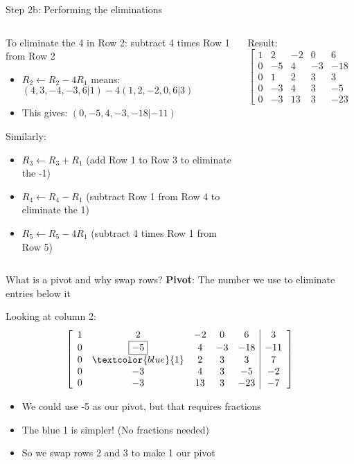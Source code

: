 \documentclass[aspectratio=169, lualatex, handout]{beamer}
\begin{document}
\begin{frame}{Step 2b: Performing the eliminations}
	\begin{columns}[c]
		\begin{column}{0.6\textwidth}
			To eliminate the 4 in Row 2: subtract 4 times Row 1 from Row 2
			\begin{itemize}
				\item $R_2 \leftarrow R_2 - 4R_1$ means: $(4, 3, -4, -3, 6 | 1) - 4(1, 2, -2, 0, 6 | 3)$
				\item This gives: $(0, -5, 4, -3, -18 | -11)$
			\end{itemize}

			Similarly:
			\begin{itemize}
				\item $R_3 \leftarrow R_3 + R_1$ (add Row 1 to Row 3 to eliminate the -1)
				\item $R_4 \leftarrow R_4 - R_1$ (subtract Row 1 from Row 4 to eliminate the 1)
				\item $R_5 \leftarrow R_5 - 4R_1$ (subtract 4 times Row 1 from Row 5)
			\end{itemize}
		\end{column}
		\begin{column}{0.4\textwidth}
			Result:
			\[
				\left[\begin{array}{ccccc|c}
						1 & 2  & -2 & 0  & 6   & 3   \\
						0 & -5 & 4  & -3 & -18 & -11 \\
						0 & 1  & 2  & 3  & 3   & 7   \\
						0 & -3 & 4  & 3  & -5  & -2  \\
						0 & -3 & 13 & 3  & -23 & -7
					\end{array}\right]
			\]
		\end{column}
	\end{columns}
\end{frame}

\begin{frame}{What is a pivot and why swap rows?}
	\textbf{Pivot}: The number we use to eliminate entries below it

	Looking at column 2:
	\[
		\left[\begin{array}{ccccc|c}
				1 & 2                   & -2 & 0  & 6   & 3   \\
				0 & \boxed{-5}          & 4  & -3 & -18 & -11 \\
				0 & \textcolor{blue}{1} & 2  & 3  & 3   & 7   \\
				0 & -3                  & 4  & 3  & -5  & -2  \\
				0 & -3                  & 13 & 3  & -23 & -7
			\end{array}\right]
	\]

	\begin{itemize}
		\item We could use -5 as our pivot, but that requires fractions
		\item The blue 1 is simpler! (No fractions needed)
		\item So we swap rows 2 and 3 to make 1 our pivot
	\end{itemize}
\end{frame}
\end{document}

